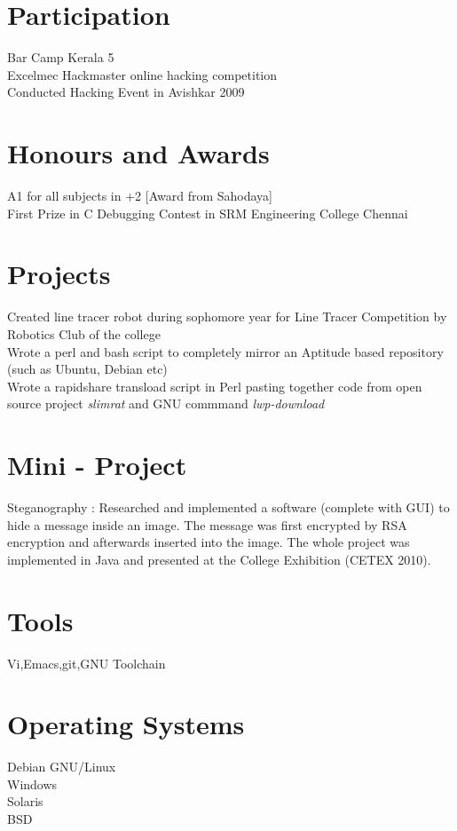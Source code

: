 \documentclass[line,margin]{res}
\begin{document}
\begin{resume}
\section{Participation}
Bar Camp Kerala 5\\
Excelmec Hackmaster online hacking competition\\
Conducted Hacking Event in Avishkar 2009\\


\section{Honours and Awards}
A1 for all subjects in +2  [Award from Sahodaya]\\
First Prize in C Debugging Contest in SRM Engineering College Chennai

\section{Projects}
Created line tracer robot during sophomore year for Line Tracer Competition by Robotics Club of the college\\

Wrote a perl and bash script to completely mirror an Aptitude based repository (such as Ubuntu, Debian etc)\\

Wrote a rapidshare transload script in Perl pasting together code from open source project {\it slimrat} and GNU commmand {\it lwp-download}
\section{Mini - Project}
Steganography : Researched and implemented a software (complete with GUI) to hide a message inside an image. The message was first encrypted by RSA encryption and afterwards inserted into the image. The whole project was implemented in Java and presented at the College Exhibition (CETEX 2010).

\section{Tools}
Vi,Emacs,git,GNU Toolchain

\section{Operating Systems}
Debian GNU/Linux\\
Windows\\
Solaris\\
BSD\\


\end{resume}
\end{document}
